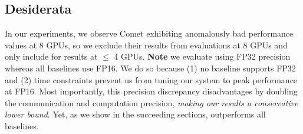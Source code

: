 \subsection{Desiderata}\label{subsec:desiderata}
In our experiments, we observe Comet exhibiting anomalously bad performance values at 8 GPUs,
so we exclude their results from evaluations at 8 GPUs and only include for results at $\leq$
4 GPUs.
\textbf{Note} we evaluate \sysname using FP32 precision whereas all baselines use FP16.
We do so because (1) no baseline supports FP32 and (2) time constraints prevent us from tuning our system
to peak performance at FP16.
Most importantly, this precision discrepancy disadvantages \sysname by doubling the
communication and computation precision, \emph{making our results a conservative lower bound}.
Yet, as we show in the succeeding sections, \sysname outperforms all baselines.
